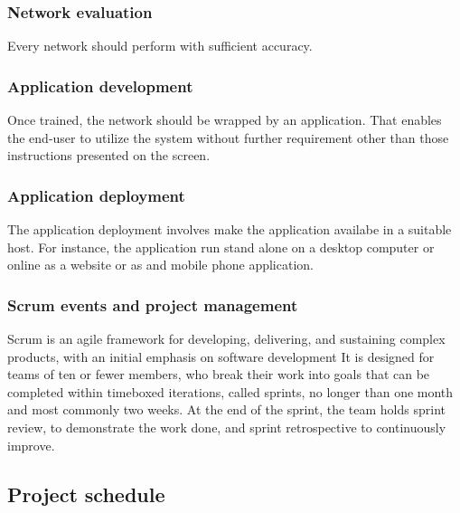 \documentclass{article}
\begin{document}
\subsubsection{Network evaluation}
\label{sec:org78bdadf}
Every network should perform with sufficient accuracy.
\subsubsection{Application development}
\label{sec:org923f3e5}
Once trained, the network should be wrapped by an application.
That enables the end-user to utilize the system without further requirement other than those instructions presented on the screen.
\subsubsection{Application deployment}
\label{sec:orgdb26378}
The application deployment involves make the application availabe in a suitable host.
For instance, the application run stand alone on a desktop computer or online as a website or as and mobile phone application.
\subsubsection{Scrum events and project management}
\label{sec:orge5215dd}
Scrum is an agile framework for developing, delivering, and sustaining complex products, with an initial emphasis on software development
It is designed for teams of ten or fewer members, who break their work into goals that can be completed within timeboxed iterations, called sprints, no longer than one month and most commonly two weeks.
At the end of the sprint, the team holds sprint review, to demonstrate the work done, and sprint retrospective to continuously improve.

\subsection{Project schedule}
\label{sec:org099132c}
\end{document}
